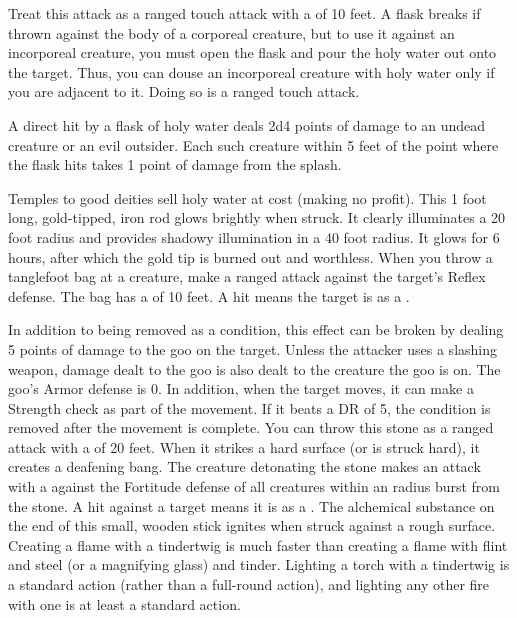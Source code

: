         \par Treat this attack as a ranged touch attack with a  of 10 feet. A flask breaks if thrown against the body of a corporeal creature, but to use it against an incorporeal creature, you must open the flask and pour the holy water out onto the target. Thus, you can douse an incorporeal creature with holy water only if you are adjacent to it. Doing so is a ranged touch attack.
        \par A direct hit by a flask of holy water deals 2d4 points of damage to an undead creature or an evil outsider. Each such creature within 5 feet of the point where the flask hits takes 1 point of damage from the splash.
        \par Temples to good deities sell holy water at cost (making no profit).
         This 1 foot long, gold-tipped, iron rod glows brightly when struck. It clearly illuminates a 20 foot radius and provides shadowy illumination in a 40 foot radius. It glows for 6 hours, after which the gold tip is burned out and worthless.
         When you throw a tanglefoot bag at a creature, make a ranged attack against the target's Reflex defense.
        The bag has a  of 10 feet.
        A hit means the target is \slowed as a .
        \par In addition to being removed as a condition, this effect can be broken by dealing 5 points of damage to the goo on the target.
        Unless the attacker uses a slashing weapon, damage dealt to the goo is also dealt to the creature the goo is on.
        The goo's Armor defense is 0. %
        In addition, when the target moves, it can make a Strength check as part of the movement.
        If it beats a DR of 5, the condition is removed after the movement is complete.
         You can throw this stone as a ranged attack with a  of 20 feet.
        When it strikes a hard surface (or is struck hard), it creates a deafening bang.
        The creature detonating the stone makes an attack with a   against the Fortitude defense of all creatures within an \areasmall radius burst from the stone.
        A hit against a target means it is \deafened as a .
         The alchemical substance on the end of this small, wooden stick ignites when struck against a rough surface. Creating a flame with a tindertwig is much faster than creating a flame with flint and steel (or a magnifying glass) and tinder. Lighting a torch with a tindertwig is a standard action (rather than a full-round action), and lighting any other fire with one is at least a standard action.

